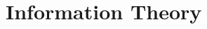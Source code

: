 \documentclass{styles/tufte}
\author{Jiaming (George) Yu}
\date{\today}
\begin{document}
\maketitle
\tableofcontents
\newpage



\section{Information Theory}
\end{document}
